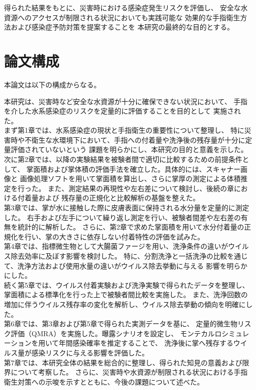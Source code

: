 得られた結果をもとに、災害時における感染症発生リスクを評価し、
安全な水資源へのアクセスが制限される状況においても実践可能な
効果的な手指衛生方法および感染症予防対策を提案することを
本研究の最終的な目的とする。


\section{論文構成}

本論文は以下の構成からなる。

本研究は、災害時など安全な水資源が十分に確保できない状況において、
手指を介した水系感染症のリスクを定量的に評価することを目的として
実施された。\\

まず第1章では、水系感染症の現状と手指衛生の重要性について整理し、
特に災害時や不衛生な水環境下において、手指への付着量や洗浄後の残存量が十分に定量評価されていないという
課題を明らかにし、本研究の目的と意義を示した。\\ 

次に第2章では、以降の実験結果を被験者間で適切に比較するための前提条件として、
掌面積および掌体積の評価手法を確立した。具体的には、スキャナー画像と
画像処理ソフトを用いて掌面積を算出し、さらに掌厚の測定による体積推定を行った。
また、測定結果の再現性や左右差について検討し、後続の章における付着量および
残存量の正規化と比較解析の基盤を整えた。\\

第3章では、掌が水に接触した際に皮膚表面に保持される水分量を定量的に測定した。
右手および左手について繰り返し測定を行い、被験者間差や左右差の有無を統計的に解析した。
さらに、第2章で求めた掌面積を用いて水分付着量の正規化を行い、掌の大きさに依存しない付着特性の評価を試みた。\\

第4章では、指標微生物として大腸菌ファージを用い、洗浄条件の違いがウイルス除去効率に及ぼす影響を検討した。
特に、分割洗浄と一括洗浄の比較を通じて、洗浄方法および使用水量の違いがウイルス除去挙動に与える
影響を明らかにした。\\

続く第5章では、ウイルス付着実験および洗浄実験で得られたデータを整理し、
掌面積による標準化を行った上で被験者間比較を実施した。
また、洗浄回数の増加に伴うウイルス残存率の変化を解析し、ウイルス除去挙動の傾向を明確にした。\\ 

第6章では、第3章および第5章で得られた実測データを基に、
定量的微生物リスク評価（QMRA）を実施した。曝露シナリオを設定し、
モンテカルロシミュレーションを用いて年間感染確率を推定することで、
洗浄後に掌へ残存するウイルス量が感染リスクに与える影響を評価した。\\

第7章では、本研究全体の結果を総合的に整理し、得られた知見の意義および限界について考察した。
さらに、災害時や水資源が制限される状況における手指衛生対策への示唆を示すとともに、今後の課題について述べた。 

